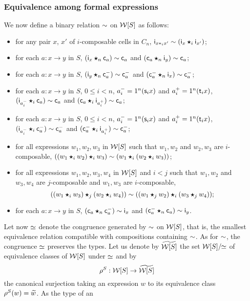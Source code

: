  \subsubsection{Equivalence among formal
   expressions}\label{ssubsec:eqform}
We now define a
binary relation $\sim$ on $\mathcal{W}[S]$ as follows:
\begin{itemize}
\item for any pair $x$, $x'$ of $i$-composable cells in $C_n$,
  $\mathsf{i}_{x\ast_{i} x'}\sim (\mathsf{i}_{x}\bm{\star}_{i}\mathsf{i}_{x'})$;
\item for each $a:x\to y$ in $S$, $(\mathsf{i}_{x}\bm{\star}_{n}\mathsf{c}_{a})\sim
  \mathsf{c}_{a}$ and $(\mathsf{c}_{a}\bm{\star}_{n} \mathsf{i}_{y})\sim \mathsf{c}_{a}$;
 \item for each $a:x\to y$ in $S$, $(\mathsf{i}_{y}\bm{\star}_{n}\mathsf{c}^{-}_{a})\sim
   \mathsf{c}^{-}_{a}$ and $(\mathsf{c}^{-}_{a}\bm{\star}_{n} \mathsf{i}_{x})\sim \mathsf{c}^{-}_{a}$;
\item for each $a:x\to y$ in $S$, $0\leq i< n$, $a_i^{-}=1^{n}(\mathsf{s}_{i}
  x)$ and $a_i^{+}=1^{n}(\mathsf{t}_{i} x)$, $(\mathsf{i}_{a_i^{-}}\bm{\star}_{i}\mathsf{c}_{a})\sim
  \mathsf{c}_{a}$ and $(\mathsf{c}_{a}\bm{\star}_{i} \mathsf{i}_{a_i^+})\sim \mathsf{c}_{a}$;
\item for each $a:x\to y$ in $S$, $0\leq i< n$, $a_i^{-}=1^{n}(\mathsf{s}_{i}
  x)$ and $a_i^{+}=1^{n}(\mathsf{t}_{i} x)$, $(\mathsf{i}_{a_i^{-}}\bm{\star}_{i}\mathsf{c}^{-}_{a})\sim
  \mathsf{c}^{-}_{a}$ and $(\mathsf{c}^{-}_{a}\bm{\star}_{i} \mathsf{i}_{a_i^+})\sim \mathsf{c}^{-}_{a}$;  
 \item for all expressions $w_1,w_2,w_3$ in $\mathcal{W}[S]$ such that $w_1,w_2$ and
   $w_2,w_3$ are $i$-composable, $((w_1\bm{\star}_{i} w_2)\bm{\star}_{i} w_3)\sim
   (w_1\bm{\star}_{i}(w_2\bm{\star}_{i} w_3))$;
 \item for all expressions $w_1,w_2,w_3,w_4$ in $\mathcal{W}[S]$ and $i<j$
   such that $w_1,w_2$ and $w_3,w_4$ are
   $j$-composable and $w_1,w_3$ are $i$-composable,
   \[
     ((w_1\bm{\star}_{i} w_3)\bm{\star}_{j} (w_2\bm{\star}_{i} w_4))\sim ((w_1\bm{\star}_{j}
     w_2)\bm{\star}_{i} (w_3\bm{\star}_{j} w_4));
   \]
  \item for each $a:x\to y$ in $S$, $(\mathsf{c}_{a}\bm{\star}_{n}\mathsf{c}^{-}_{a})\sim
    \mathsf{i}_{x}$ and $(\mathsf{c}^{-}_{a}\bm{\star}_{n}\mathsf{c}_{a})\sim \mathsf{i}_{y}$. 
  \end{itemize}
  Let now $\simeq$ denote the congruence generated by
  $\sim$ on $\mathcal{W}[S]$, that is, the smallest equivalence relation
  compatible with compositions containing $\sim$. As for $\sim$, the
  congruence $\simeq$ preserves the types. Let us denote by $\widetilde{\mathcal{W}[S]}$
  the set $\mathcal{W}[S]/\!\!\simeq$ of equivalence classes of $\mathcal{W}[S]$ under
  $\simeq$ and by
  \[\rho^{S}: \mathcal{W}[S]\to \widetilde{\mathcal{W}[S]}\]
  the canonical surjection taking an expression $w$ to its
  equivalence class $\rho^{S}(w)=\widetilde{w}$. As the type of an

